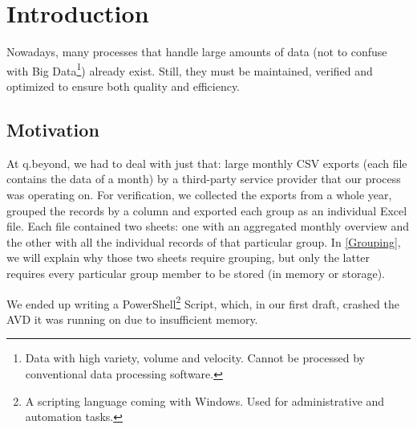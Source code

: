 \setcounter{page}{1}
\pagestyle{fancy}
\fancyhf{}
\fancyhead[R]{\thepage}
\renewcommand{\headrulewidth}{0pt} %

\section{Introduction}
Nowadays, many processes that handle large amounts of data (not to confuse with Big Data\footnote{Data
with high variety, volume and velocity. Cannot be processed by conventional data processing software.})
already exist. Still, they must be maintained, verified and optimized to ensure both
quality and efficiency.

\subsection{Motivation} \label{Motivation}
At q.beyond, we had to deal with just that: large monthly CSV exports
(each file contains the data of a month) by a third-party service provider
that our process was operating on. For verification, we collected the exports from a whole year,
grouped the records by a column and exported each group as an individual Excel file.
Each file contained two sheets: one with an aggregated monthly overview and the other with all the
individual records of that particular group.
In \ref{Grouping}, we will explain why those
two sheets require grouping, but only the latter requires every particular group member to be stored
(in memory or storage).


We ended up writing a PowerShell\footnote{A scripting language coming with Windows. Used for administrative and automation tasks.}
Script, which, in our first draft, crashed the \gls{AVD}
it was running on due to insufficient memory.

